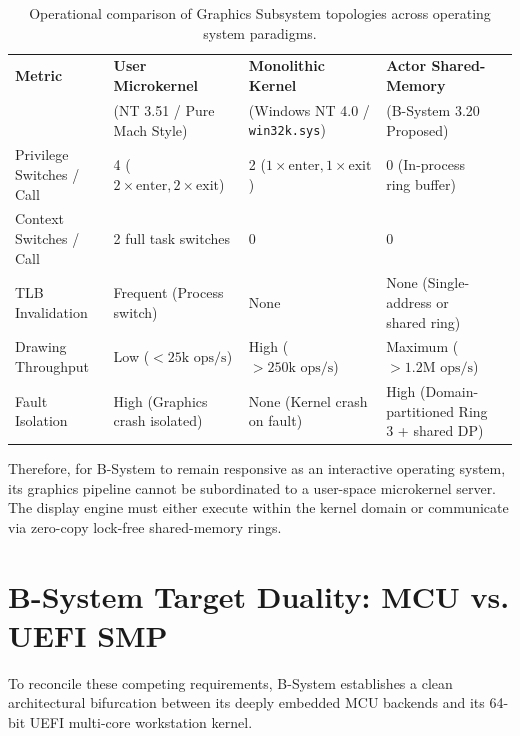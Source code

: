 \documentclass[10pt,journal,compsoc,twocolumn]{article}
\begin{document}
\begin{table}[htbp]
\centering
\caption{Operational comparison of Graphics Subsystem topologies across operating system paradigms.}
\label{tab:graphics_perf}
\footnotesize
\begin{tabular}{@{}lllll@{}}
\toprule
\textbf{Metric} & \textbf{User Microkernel} & \textbf{Monolithic Kernel} & \textbf{Actor Shared-Memory} \\
 & (NT 3.51 / Pure Mach Style) & (Windows NT 4.0 / \texttt{win32k.sys}) & (B-System 3.20 Proposed) \\ \midrule
Privilege Switches / Call & 4 ($2\times \text{enter}, 2\times \text{exit}$) & 2 ($1\times \text{enter}, 1\times \text{exit}$) & 0 (In-process ring buffer) \\
Context Switches / Call & 2 full task switches & 0 & 0 \\
TLB Invalidation & Frequent (Process switch) & None & None (Single-address or shared ring) \\
Drawing Throughput & Low ($<25\text{k ops/s}$) & High ($>250\text{k ops/s}$) & Maximum ($>1.2\text{M ops/s}$) \\
Fault Isolation & High (Graphics crash isolated) & None (Kernel crash on fault) & High (Domain-partitioned Ring 3 + shared DP) \\ \bottomrule
\end{tabular}
\end{table}

Therefore, for B-System to remain responsive as an interactive operating system, its graphics pipeline cannot be subordinated to a user-space microkernel server. The display engine must either execute within the kernel domain or communicate via zero-copy lock-free shared-memory rings.

\section{B-System Target Duality: MCU vs. UEFI SMP}
\label{sec:duality}

To reconcile these competing requirements, B-System establishes a clean architectural bifurcation between its deeply embedded MCU backends and its 64-bit UEFI multi-core workstation kernel.
\end{document}
